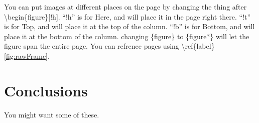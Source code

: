 \documentclass{article}
\begin{document}
You can put images at different places on the page by changing the thing after \textbackslash begin\{figure\}[!h].
``!h'' is for Here, and will place it in the page right there.
``!t'' is for Top, and will place it at the top of the column.
``!b'' is for Bottom, and will place it at the bottom of the column.
changing \{figure\} to \{figure*\} will let the figure span the entire page.
You can refrence pages using \textbackslash ref\{label\} \ref{fig:rawFrame}.





\section{Conclusions}
You might want some of these.






\end{document}

